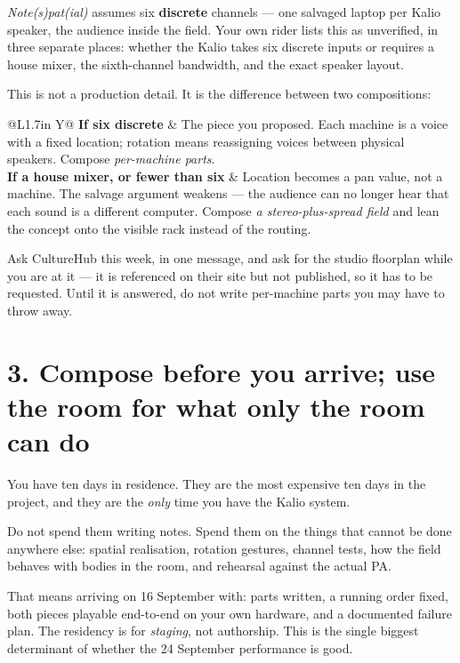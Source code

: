 \documentclass[11pt]{article}
\begin{document}
\emph{Note(s)pat(ial)} assumes six \textbf{discrete} channels — one salvaged
laptop per Kalio speaker, the audience inside the field. Your own rider lists
this as unverified, in three separate places: whether the Kalio takes six
discrete inputs or requires a house mixer, the sixth-channel bandwidth, and the
exact speaker layout.

This is not a production detail. It is the difference between two compositions:

{\fontsize{10.4pt}{13.2pt}\selectfont
\begin{tabularx}{\linewidth}{@{}L{1.7in} Y@{}}
\toprule
\textbf{If six discrete} & The piece you proposed. Each machine is a voice with a fixed location; rotation means reassigning voices between physical speakers. Compose \emph{per-machine parts}. \\
\textbf{If a house mixer, or fewer than six} & Location becomes a pan value, not a machine. The salvage argument weakens — the audience can no longer hear that each sound is a different computer. Compose \emph{a stereo-plus-spread field} and lean the concept onto the visible rack instead of the routing. \\
\bottomrule
\end{tabularx}}

Ask CultureHub this week, in one message, and ask for the studio floorplan while
you are at it — it is referenced on their site but not published, so it has to be
requested. Until it is answered, do not write per-machine parts you may have to
throw away.

\section{3. Compose before you arrive; use the room for what only the room can do}

You have ten days in residence. They are the most expensive ten days in the
project, and they are the \emph{only} time you have the Kalio system.

Do not spend them writing notes. Spend them on the things that cannot be done
anywhere else: spatial realisation, rotation gestures, channel tests, how the
field behaves with bodies in the room, and rehearsal against the actual PA.

That means arriving on 16 September with: parts written, a running order fixed,
both pieces playable end-to-end on your own hardware, and a documented failure
plan. The residency is for \emph{staging}, not authorship. This is the single
biggest determinant of whether the 24 September performance is good.
\end{document}
